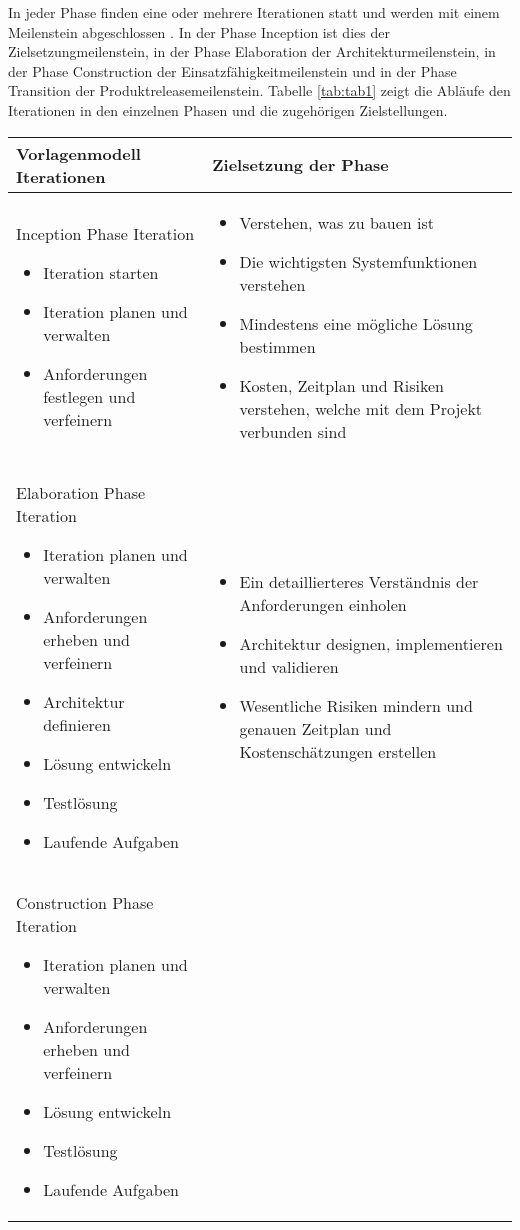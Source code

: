In jeder Phase finden eine oder mehrere Iterationen statt und werden mit einem Meilenstein abgeschlossen \cite{Basem2010}. In der Phase Inception ist dies der Zielsetzungmeilenstein, in der Phase Elaboration der Architekturmeilenstein, in der Phase Construction der Einsatzfähigkeitmeilenstein und in der Phase Transition der Produktreleasemeilenstein. Tabelle \ref{tab:tab1} zeigt die Abläufe den Iterationen in den einzelnen Phasen und die zugehörigen Zielstellungen.
\begin{longtable}{|p{7cm}|p{8cm}|}
\hline
Vorlagenmodell Iterationen & Zielsetzung der Phase \\
\hline
Inception Phase Iteration 
\begin {itemize}
\item Iteration starten 
 \item  Iteration planen und verwalten
 \item  Anforderungen festlegen und verfeinern 
  \end{itemize}
   &
  
  \begin {itemize}
\item Verstehen, was zu bauen ist
 \item Die wichtigsten Systemfunktionen verstehen 
\item Mindestens eine mögliche Lösung bestimmen
\item Kosten, Zeitplan und Risiken verstehen, welche mit dem Projekt verbunden sind
  \end{itemize}

 \\
\hline
 Elaboration Phase Iteration 
   \begin {itemize}
   \item Iteration planen und verwalten
   \item Anforderungen erheben und verfeinern
   \item Architektur definieren
   \item Lösung entwickeln
   \item Testlösung
   \item Laufende Aufgaben
   
  \end{itemize}

  & 
     \begin {itemize}
   \item Ein detaillierteres Verständnis der Anforderungen einholen
   \item Architektur designen, implementieren und validieren
   \item  Wesentliche Risiken mindern und genauen Zeitplan und Kostenschätzungen erstellen
    \end{itemize}
 \\
\hline
\hline
Construction Phase Iteration 
   \begin {itemize}
   \item Iteration planen und verwalten
   \item Anforderungen erheben und verfeinern
     \item Lösung entwickeln
   \item Testlösung
   \item Laufende Aufgaben


\end{itemize}
\end{longtable}
